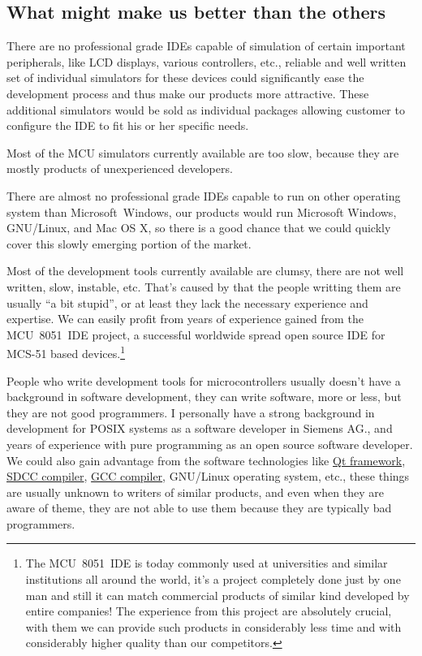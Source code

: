 \documentclass[a4paper,twoside,15pt]{book}
\begin{document}
		\subsection{What might make us better than the others}
			\begin{dinglist}{73}
				\item There are no professional grade IDEs capable of simulation of certain important peripherals, like LCD displays, various controllers, etc., reliable and well written set of individual simulators for these devices could significantly ease the development process and thus make our products more attractive. These additional simulators would be sold as individual packages allowing customer to configure the IDE to fit his or her specific needs.
				\item Most of the MCU simulators currently available are too slow, because they are mostly products of unexperienced developers.
				\item There are almost no professional grade IDEs capable to run on other operating system than Microsoft\textregistered{}~Windows\textregistered{}, our products would run Microsoft Windows, GNU/Linux, and Mac OS X, so there is a good chance that we could quickly cover this slowly emerging portion of the market.
				\item Most of the development tools currently available are clumsy, there are not well written, slow, instable, etc. That's caused by that the people writting them are usually ``a bit stupid'', or at least they lack the necessary experience and expertise. We can easily profit from years of experience gained from the MCU~8051~IDE project, a successful worldwide spread open source IDE for MCS-51 based devices.\footnote{The MCU~8051~IDE is today commonly used at universities and similar institutions all around the world, it's a project completely done just by one man and still it can match commercial products of similar kind developed by entire companies! The experience from this project are absolutely crucial, with them we can provide such products in considerably less time and with considerably higher quality than our competitors.}
				\item People who write development tools for microcontrollers usually doesn't have a background in software development, they can write software, more or less, but they are not good programmers. I personally have a strong background in development for POSIX systems as a software developer in Siemens AG., and years of experience with pure programming as an open source software developer. We could also gain advantage from the software technologies like \href{http://en.wikipedia.org/wiki/Qt_framework}{Qt framework}, \href{http://en.wikipedia.org/wiki/Small_Device_C_Compiler}{SDCC compiler}, \href{http://en.wikipedia.org/wiki/GNU_Compiler_Collection}{GCC compiler}, GNU/Linux operating system, etc., these things are usually unknown to writers of similar products, and even when they are aware of theme, they are not able to use them because they are typically bad programmers.
			\end{dinglist}
\end{document}

